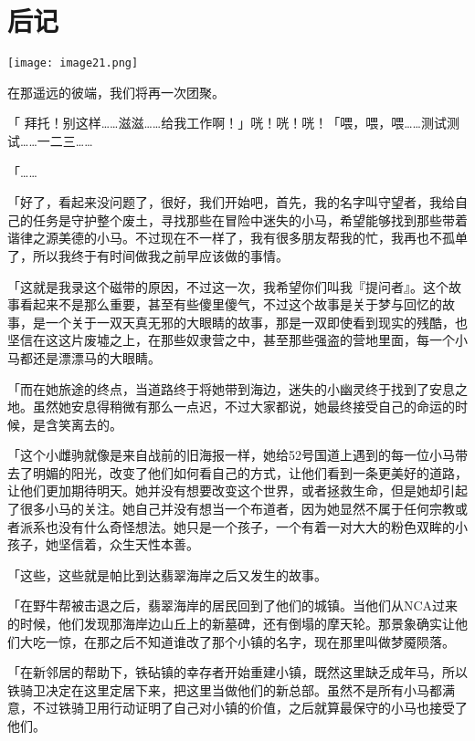 \chapter{后记}

\texttt{[image: image21.png]}

\begin{intro}
    在那遥远的彼端，我们将再一次团聚。
\end{intro}

{\rt

「 拜托！别这样……滋滋……给我工作啊！」咣！咣！咣！「喂，喂，喂……测试测试……一二三……

「……

「好了，看起来没问题了，很好，我们开始吧，首先，我的名字叫守望者，我给自己的任务是守护整个废土，寻找那些在冒险中迷失的小马，希望能够找到那些带着谐律之源美德的小马。不过现在不一样了，我有很多朋友帮我的忙，我再也不孤单了，所以我终于有时间做我之前早应该做的事情。

「这就是我录这个磁带的原因，不过这一次，我希望你们叫我『提问者』。这个故事看起来不是那么重要，甚至有些傻里傻气，不过这个故事是关于梦与回忆的故事，是一个关于一双天真无邪的大眼睛的故事，那是一双即使看到现实的残酷，也坚信在这这片废墟之上，在那些奴隶营之中，甚至那些强盗的营地里面，每一个小马都还是漂漂马的大眼睛。

「而在她旅途的终点，当道路终于将她带到海边，迷失的小幽灵终于找到了安息之地。虽然她安息得稍微有那么一点迟，不过大家都说，她最终接受自己的命运的时候，是含笑离去的。

「这个小雌驹就像是来自战前的旧海报一样，她给52号国道上遇到的每一位小马带去了明媚的阳光，改变了他们如何看自己的方式，让他们看到一条更美好的道路，让他们更加期待明天。她并没有想要改变这个世界，或者拯救生命，但是她却引起了很多小马的关注。她自己并没有想当一个布道者，因为她显然不属于任何宗教或者派系也没有什么奇怪想法。她只是一个孩子，一个有着一对大大的粉色双眸的小孩子，她坚信着，众生天性本善。

「这些，这些就是帕比到达翡翠海岸之后又发生的故事。

「在野牛帮被击退之后，翡翠海岸的居民回到了他们的城镇。当他们从NCA过来的时候，他们发现那海岸边山丘上的新墓碑，还有倒塌的摩天轮。那景象确实让他们大吃一惊，在那之后不知道谁改了那个小镇的名字，现在那里叫做梦魇陨落。

「在新邻居的帮助下，铁砧镇的幸存者开始重建小镇，既然这里缺乏成年马，所以铁骑卫决定在这里定居下来，把这里当做他们的新总部。虽然不是所有小马都满意，不过铁骑卫用行动证明了自己对小镇的价值，之后就算最保守的小马也接受了他们。

}
